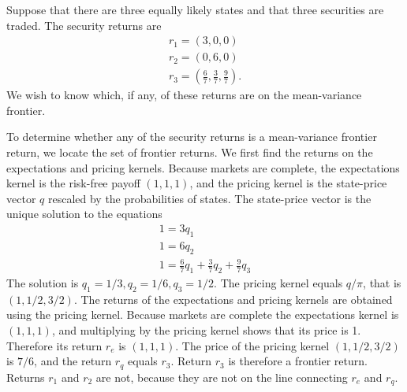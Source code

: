 \documentclass[\topdir/lecture\_notes.tex]{subfiles}
\begin{document}
\begin{example}\label{ex:mean_variance_frontier_example} Suppose that there are three equally likely states and that three securities are traded. The security returns are
\begin{gather*}
r_{1}=(3,0,0) \\
r_{2}=(0,6,0) \\
r_{3}=\left(\frac{6}{7}, \frac{3}{7}, \frac{9}{7}\right) . 
\end{gather*}
We wish to know which, if any, of these returns are on the mean-variance frontier.

To determine whether any of the security returns is a mean-variance frontier return, we locate the set of frontier returns. We first find the returns on the expectations and pricing kernels. Because markets are complete, the expectations kernel is the risk-free payoff $(1,1,1)$, and the pricing kernel is the state-price vector \(q\) rescaled by the probabilities of states. The state-price vector is the unique solution to the equations
\begin{gather*}
1=3 q_{1} \\
1=6 q_{2} \\
1=\frac{6}{7} q_{1}+\frac{3}{7} q_{2}+\frac{9}{7} q_{3} 
\end{gather*}
The solution is \(q_{1}=1 / 3, q_{2}=1 / 6, q_{3}=1 / 2\). The pricing kernel equals \(q / \pi\), that is $(1,1 / 2,3 / 2)$.
The returns of the expectations and pricing kernels are obtained using the pricing kernel. Because markets are complete the expectations kernel is $(1,1,1)$, and multiplying by the pricing kernel shows that its price is 1. Therefore its return \(r_{e}\) is $(1,1,1)$. The price of the pricing kernel $(1,1 / 2,3 / 2)$ is \(7 / 6\), and the return \(r_{q}\) equals \(r_{3}\). Return \(r_{3}\) is therefore a frontier return. Returns \(r_{1}\) and \(r_{2}\) are not, because they are not on the line connecting \(r_{e}\) and \(r_{q}\).
\end{example}
\end{document}

